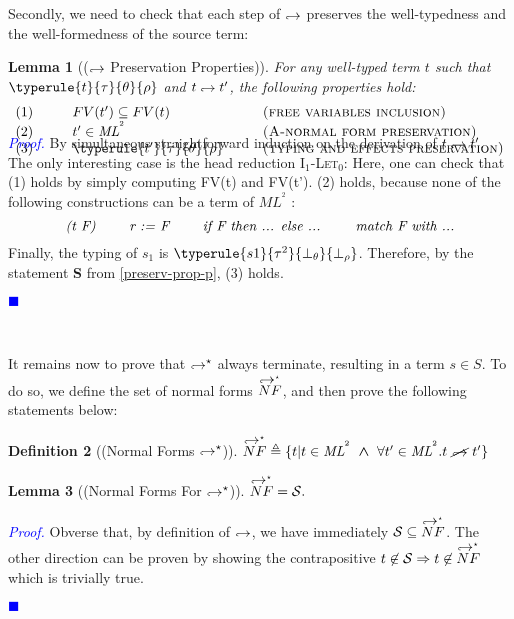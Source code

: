 \documentclass[a4paper,11pt,oneside]{article}
\theoremstyle{plain}
\newtheorem{definition}{Definition}[subsection]
\newtheorem{lemma}[definition]{Lemma}
\renewenvironment{proof}{\noindent \textcolor{blue}{\textit{Proof.}}}
{{\begin{tiny}\textcolor{blue}{$\blacksquare$}\end{tiny}}\\}
\newcommand{\tmlet}[3]{let~#1=#2~in~#3}
\newcommand{\tmsbst}[3]{#1 [#2 \mapsfrom #3] }
\newcommand{\bwedge}{\boldsymbol{~\wedge~}}
\newcommand{\bth}{\bot_\theta}
\newcommand{\brh}{\bot_\rho}
\newcommand{\inlS}{\mathcal{S}}
\newcommand{\inlsrc}{\textit{ML}^{^2}}
\newcommand{\inlT}{\inlsrc}
\newcommand{\hookdownarrow}{\mathrel{\rotatebox[origin=c]{180}{$\hookleftarrow$}}}
\newcommand{\inlletarr}{\hookdownarrow}
\newcommand{\inlletstar}{\hookdownarrow^{\star}}
\newcommand{\inlletplus}{\inlletstar}
\newcommand{\inlletNF}{\overset{\inlletplus}{NF}}
\newcommand{\inllet}[2]{#1 \hookdownarrow #2}
\begin{document}
	Secondly, we need to check that each step of $\inlletarr$ preserves the well-typedness and the well-formedness of the source term:
\begin{lemma}[($\inlletarr$ Preservation Properties)]
For any well-typed term $t$ such that\\ $\typerule{t}{\tau}{\theta}{\rho}$ and $\inllet{t}{t'}$, the following properties hold:
\begin{displaymath}
\begin{array}{l@{\hspace*{1cm}}l@{\hspace*{1cm}}l}
	(1)& FV(t') \subseteq FV(t) & \textsc{(free variables inclusion)} \\
	(2)& t' \in \inlT & \textsc{(A-normal form preservation)}\\ 
	(3)& \typerule{t'}{\tau}{\theta}{\rho} &\textsc{(typing and effects preservation)} \vspace*{-1cm}
\end{array}
\end{displaymath}
 \label{inllet-prop-l}
\end{lemma}
\begin{proof}
	By simultaneous straightforward induction on the derivation of $\inllet{t}{t'}$. 
	The only interesting case is the head reduction \textsc{I$_1$-Let$_0$}:
			{\boldsymbol{\tmlet{F}{s_1}{s_2} \hookdownarrow 				
			\tmsbst{s_2}{F}{s_1}}}
	Here, one can check that (1) holds by simply computing  FV(t) and FV(t').
	(2) holds, because none of the following constructions can be a term of $\inlsrc$ : 
$$\textit{(t~F) \qquad r~:=~F \qquad if~F~then~... else ... \qquad match~F~with~...}$$
	Finally, the typing of $s_1$ is $\typerule{s1}{\tau^2}{\bth}{\brh}$.	
	Therefore, by the statement \textbf{S} from \cref{preserv-prop-p}, (3) holds. 
 \end{proof}

	It remains now to prove that $\inlletstar$ always terminate, resulting in a term $s \in S$.  
	To do so, we define the set of normal forms $\inlletNF$, and then prove the following statements below: 
\begin{definition}[(Normal Forms $\inlletstar$)]
 $ \inlletNF \triangleq \{ t | t \in \inlT \bwedge 
 \forall t' \in \inlT. t~\cancel{\inlletarr}~t' \} $
\end{definition}

\begin{lemma}[(Normal Forms For $\inlletstar$)] 
$ \inlletNF  = \inlS.$
\label{inllet-nforms-l}
\end{lemma}
\begin{proof}
Obverse that, by definition of $\inlletarr$, we have immediately $\inlS \subseteq  \inlletNF$. The other direction can be proven by showing the contrapositive $t \not\in \inlS \Rightarrow t \not\in \inlletNF$ which is trivially true.
\end{proof}
\end{document}
